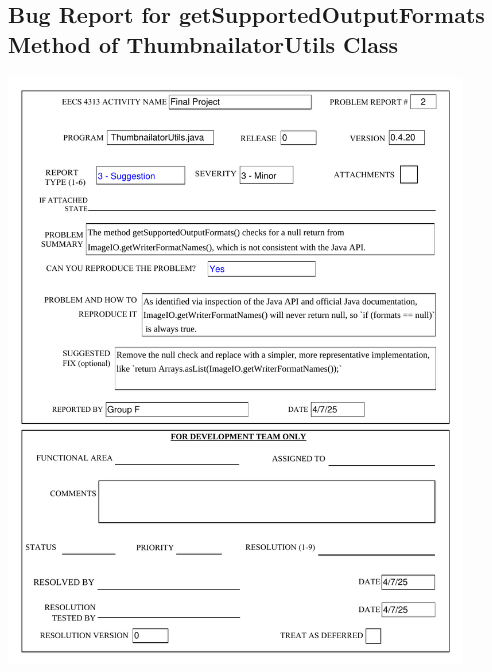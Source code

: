 \documentclass[12pt]{article}
\begin{document}
\begin{appendices}
        \markboth{}{}
        \section{Bug Report for getSupportedOutputFormats Method of ThumbnailatorUtils Class}
        \label{sec:appendix_b}
        \markboth{}{}
        \begin{center}
            \includegraphics[width=0.9\textwidth]{bug_reports/Bug_Report_2_print.pdf}
        \end{center}
    \end{appendices}
\end{document}
